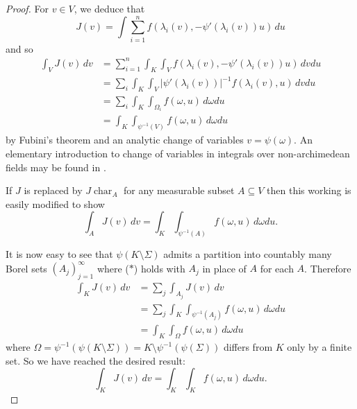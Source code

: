 \documentclass{lmsMODIFIED}
\newcommand{\abs}[1]{\vert#1\vert}
\newcommand{\w}{\omega}
\DeclareMathOperator{\Char}{char}
\begin{document}
\begin{appendix}
\begin{proof}
For $v\in V$, we deduce that \[J(v)=\int \sum_{i=1}^n f(\lambda_i(v),-\psi'(\lambda_i(v))u)\,du\] and so
\begin{align*}
	\int_VJ(v)\,dv
	&=\sum_{i=1}^n\int_K\int_V  f(\lambda_i(v),-\psi'(\lambda_i(v))u)\,dvdu\\
	&=\sum_i\int_K\int_V\abs{\psi'(\lambda_i(v))}^{-1}f(\lambda_i(v),u)\,dvdu\\
	&=\sum_i\int_K\int_{\Omega_i} f(\w,u)\,d\w du\\
	&=\int_K\int_{\psi^{-1}(V)} f(\w,u)\,d\w du
\end{align*}
by Fubini's theorem and an analytic change of variables $v=\psi(\w)$. An elementary introduction to change of variables in integrals over non-archimedean fields may be found in \cite{Vladimirov1994}.

If $J$ is replaced by $J\Char_{A}$ for any measurable subset $A\subseteq V$ then this working is easily modified to show \[\int_AJ(v)\,dv=\int_K\int_{\psi^{-1}(A)} f(\w,u)\,d\w du\tag{$\ast$}.\]

It is now easy to see that $\psi(K\setminus \Sigma)$ admits a partition into countably many Borel sets $(A_j)_{j=1}^{\infty}$ where ($\ast$) holds with $A_j$ in place of $A$ for each $A$. Therefore
\begin{align*}
	\int_K J(v)\,dv
	&=\sum_j\int_{A_j} J(v)\,dv\\
	&=\sum_j\int_K\int_{\psi^{-1}(A_j)} f(\w,u)\,d\w du\\
	&=\int_K\int_{\Omega}f(\w,u)\,d\w du
\end{align*}
where $\Omega=\psi^{-1}(\psi(K\setminus\Sigma))=K\setminus \psi^{-1}(\psi(\Sigma))$ differs from $K$ only by a finite set. So we have reached the desired result: \[\int_K J(v)\,dv=\int_K\int_Kf(\w,u)\,d\w du.\]
\end{proof}
\end{appendix}
\end{document}
